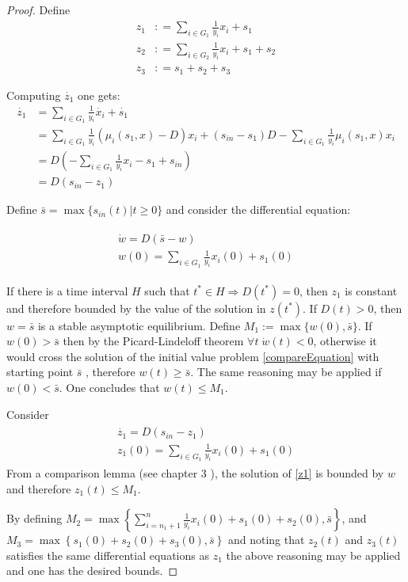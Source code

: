 \documentclass[3p,times]{article}
\begin{document}
\systembounds* 

\begin{proof}
	Define 
	\begin{align}
	z_1 &: = \sum \limits_{i \in G_1} \frac{1}{y_i}x_i + s_1  \\
	z_2 &: = \sum \limits_{i \in G_2} \frac{1}{y_i}x_i + s_1 + s_2 \\
	z_3 &: = s_1 + s_2 + s_3
	\end{align} 
	
	Computing $\dot{z_{1}}$ one gets:
	\begin{align*}
	\dot{z_{1}} &=\sum \limits_{i \in G_1} \frac{1}{y_i}\dot{x_i} + \dot{s_1} \\
	& = \sum \limits_{i \in G_1} \frac{1}{y_i}\left(\mu_i(s_1,x) -D \right)x_i + (s_{in}-s_1)D-\sum\limits_{i \in G_1}\frac{1}{y_i}\mu_i(s_1,x) x_i   \\
	&= 	D\left(-\sum \limits_{i \in G_1} \frac{1}{y_i}x_i - s_1 + s_{in}\right)  \\
	& = D(s_{in} - z_1)
	\end{align*}
	
	Define $\bar{s} =\max\{s_{in}(t) | t\geq 0\}$ and consider the differential equation:
	
	\begin{align}
	\label{compareEquation}
	\begin{array}{l}
	\dot{w} = D(\bar{s} - w) \\
	w(0) = \sum \limits_{i \in G_1} \frac{1}{y_i}x_i(0) + s_1(0)
	\end{array}
	\end{align}
	
	If there is a time interval $H$ such that $t^*\in H  \Rightarrow D(t^*) = 0$, then $z_1$ is constant and therefore bounded by  the value of the solution in $z(t^*)$. 
	If $D(t) > 0$, then $w = \bar{s}$ is a stable asymptotic equilibrium. Define $M_1 :=  \max\{w(0),\bar{s}\}$. If $ w(0) > \bar{s}$ then by the Picard-Lindeloff theorem $ \forall t \; \dot{w}(t) < 0 $, otherwise it would cross the solution of the initial value problem \eqref{compareEquation} with starting point $\bar{s}$ , therefore $w(t) \geq \bar{s}$. The same reasoning may be applied if $ w(0) < \bar{s}$. One concludes that $ w(t) \leq M_1 $. 
	
	Consider  
	\begin{align}
	\label{z1} \begin{array}{l}
	\dot{z_1} =  D(s_{in} - z_1)\\
	z_1(0) = \sum \limits_{i \in G_1} \frac{1}{y_i}x_i(0) + s_1(0)
	\end{array} 
	\end{align}
	From a comparison lemma (see chapter 3 \cite{Khalil1996}), the solution of \eqref{z1} is bounded by $w$ and therefore $z_1(t) \leq M_1$.
	
	By defining $M_2 = \max\left \{ \displaystyle \sum \limits_{i=n_1 +1 }^{n} \frac{1}{y_i}x_i(0) + s_1(0) +s_2(0), \bar{s} \right\}$, and $M_3 =\max\left \{ s_1(0) +s_2(0) + s_3(0), \bar{s} \right\} $ and noting that $z_2(t)$ and $z_3(t)$ satisfies the same differential equations as $z_1$ the above reasoning may be applied and one has the desired bounds.
\end{proof}
\end{document}
